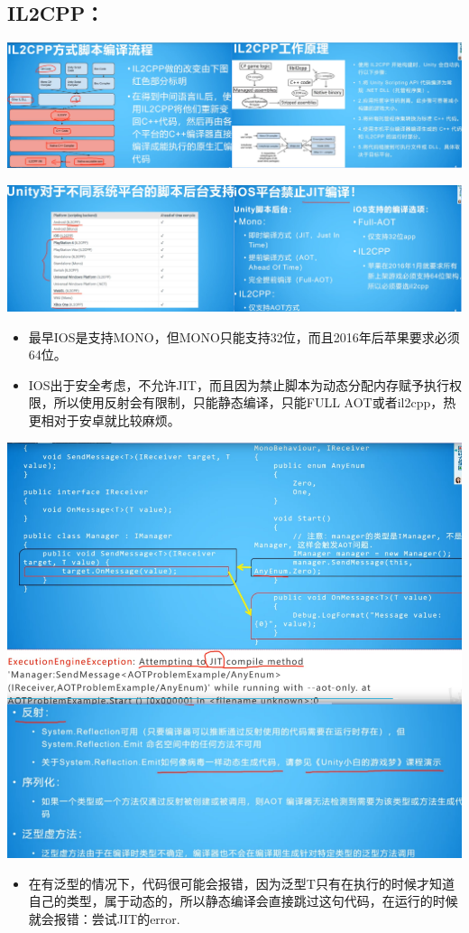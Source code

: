 \documentclass[9pt, b5paper]{article}
\begin{document}
\subsection{IL2CPP：}
\label{sec-4-2}

\includegraphics[width=.9\linewidth]{./pic/notes_20221125_094415.png}

\includegraphics[width=.9\linewidth]{./pic/notes_20221125_094520.png}
\begin{itemize}
\item 最早IOS是支持MONO，但MONO只能支持32位，而且2016年后苹果要求必须64位。
\item IOS出于安全考虑，不允许JIT，而且因为禁止脚本为动态分配内存赋予执行权限，所以使用反射会有限制，只能静态编译，只能FULL AOT或者il2cpp，热更相对于安卓就比较麻烦。
\end{itemize}

\includegraphics[width=.9\linewidth]{./pic/notes_20221125_094643.png}
\begin{itemize}
\item 在有泛型的情况下，代码很可能会报错，因为泛型T只有在执行的时候才知道自己的类型，属于动态的，所以静态编译会直接跳过这句代码，在运行的时候就会报错：尝试JIT的error.
\end{itemize}
\end{document}
